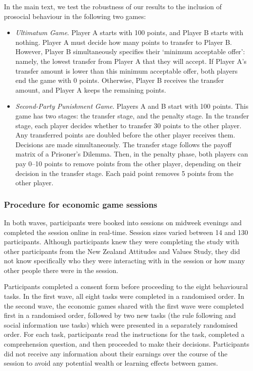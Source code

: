 \documentclass[
  man,floatsintext]{apa6}
\providecommand{\tightlist}{%
  \setlength{\itemsep}{0pt}\setlength{\parskip}{0pt}}
\begin{document}
In the main text, we test the robustness of our results to the inclusion of
prosocial behaviour in the following two games:

\begin{itemize}
\tightlist
\item
  \emph{Ultimatum Game}. Player A starts with 100 points, and Player B starts with
  nothing. Player A must decide how many points to transfer to Player B.
  However, Player B simultaneously specifies their `minimum acceptable offer':
  namely, the lowest transfer from Player A that they will accept. If Player A's
  transfer amount is lower than this minimum acceptable offer, both players end
  the game with 0 points. Otherwise, Player B receives the transfer amount, and
  Player A keeps the remaining points.
\item
  \emph{Second-Party Punishment Game}. Players A and B start with 100 points. This
  game has two stages: the transfer stage, and the penalty stage. In the
  transfer stage, each player decides whether to transfer 30 points to the other
  player. Any transferred points are doubled before the other player receives
  them. Decisions are made simultaneously. The transfer stage follows the payoff
  matrix of a Prisoner's Dilemma. Then, in the penalty phase, both players can
  pay 0--10 points to remove points from the other player, depending on their
  decision in the transfer stage. Each paid point removes 5 points from the
  other player.
\end{itemize}

\hypertarget{procedure-for-economic-game-sessions}{%
\subsubsection{Procedure for economic game sessions}\label{procedure-for-economic-game-sessions}}

In both waves, participants were booked into sessions on midweek evenings and
completed the session online in real-time. Session sizes varied between 14 and
130 participants. Although participants knew they were completing the study with
other participants from the New Zealand Attitudes and Values Study, they did not
know specifically who they were interacting with in the session or how many
other people there were in the session.

Participants completed a consent form before proceeding to the eight
behavioural tasks. In the first wave, all eight tasks were completed in a
randomised order. In the second wave, the economic games shared with the first
wave were completed first in a randomised order, followed by two new tasks (the
rule following and social information use tasks) which were presented in a
separately randomised order. For each task, participants read the instructions
for the task, completed a comprehension question, and then proceeded to make
their decisions. Participants did not receive any information about their
earnings over the course of the session to avoid any potential wealth or
learning effects between games.
\end{document}
